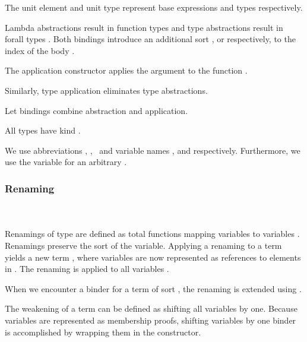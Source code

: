 \noindent The unit element  and unit type  represent base expressions and types respectively. 

\noindent Lambda abstractions   result in function types    and type abstractions   result in forall types  . 
Both bindings introduce an additional sort , or  respectively, to the index  of the body .

\noindent The application constructor    applies the argument  to the function .

\noindent Similarly, type application    eliminates type abstractions. 

\noindent Let bindings     combine abstraction and application. 

\noindent All types  have kind .

\noindent We use abbreviations \FVar, \FExpr, \FType\ and variable names ,  and  respectively. Furthermore, we use the variable  for an arbitrary   .

\subsubsection{Renaming}\hfill\\\\
Renamings  of type    are defined as total functions mapping variables    to variables   . 
Renamings preserve the sort  of the variable.
\FRen
Applying a renaming    to a term    yields a new term   , where variables are now represented as references to elements in .
\Fren
The renaming is applied to all variables .

\noindent When we encounter a binder for a term of sort , the renaming is extended using \Frenext. 

\noindent The weakening of a term can be defined as shifting all variables by one.
\Fwk 
Because variables are represented as membership proofs, shifting variables by one binder is accomplished by wrapping them in the  constructor.

